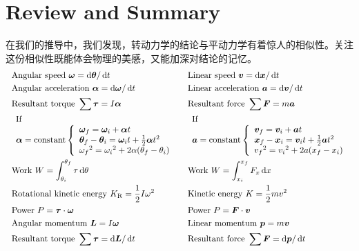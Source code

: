 \section[回顾与总结]{Review and Summary}
在我们的推导中，我们发现，转动力学的结论与平动力学有着惊人的相似性。关注这份相似性既能体会物理的美感，又能加深对结论的记忆。
\[\ \ \begin{aligned}
	&\mathrm{Angular~speed~}\vec{\omega}=\dif\vec{\theta}/\dif t&& \mathrm{Linear~speed~}\vec{v}=\dif \vec{x}/\dif t  \\
	&\mathrm{Angular~acceleration~}\vec{\alpha}=\dif\vec{\omega}/\dif t&& \mathrm{Linear~acceleration~}\vec{a}=\dif \vec{v}/\dif t  \\
	&\mathrm{Resultant~torque~}\sum\vec{\tau}=I\vec{\alpha} && \mathrm{Resultant~force~}\sum \vec{F}=m\vec{a}  \\
	&\begin{array}{l}{{\mathrm{If}}}\\{\vec{\alpha}=\mathrm{constant}}\left\{\begin{array}{l}{{\vec{\omega}_{f}=\vec{\omega}_{i}+\vec{\alpha} t}}\\{{\vec{\theta}_{f}-\vec{\theta}_{i}=\vec{\omega}_{i}t+\frac{1}{2}\vec{\alpha} t^{2}}}\\{{\omega_{f}{}^{2}=\omega_{i}{}^{2}+2\alpha(\theta_{f}-\theta_{i})}}\end{array}\right.\end{array}
	&&
	\begin{array}{l}{{\mathrm{If}}}\\{\vec{a}=\mathrm{constant}}\left\{\begin{array}{l}{{\vec{v}_{f}=\vec{v}_{i}+\vec{a}t}}\\{{\vec{x}_{f}-\vec{x}_{i}=\vec{v}_{i}t+\frac{1}{2}\vec{a}t^{2}}}\\{{v_{f}{}^{2}=v_{i}{}^{2}+2a(x_{f}-x_{i})}}\end{array}\right.\end{array}  \\
	&\mathrm{Work}\ W=\int_{\theta_{i}}^{\theta_{f}}\tau \dif\theta && \mathrm{Work}\ W=\int_{x_{i}}^{x_{f}}F_{x}\dif x  \\
	&\mathrm{Rotational~kinetic~energy~}K_{\mathrm{R}}=\frac{1}{2}I\omega^{2}&& \mathrm{Kinetic~energy~}K=\frac{1}{2}mv^{2}  \\
	&\mathrm{Power}\ P=\vec{\tau}\cdot\vec{\omega}&& \mathrm{Power}\ P=\vec{F}\cdot\vec{v}  \\
	&\mathrm{Angular~momentum~}\vec{L}=I\vec{\omega} && \mathrm{Linear~momentum~}\vec{p}=m\vec{v}  \\
	&\mathrm{Resultant~torque~}\sum\vec{\tau}=\dif \vec{L}/\dif t&& \mathrm{Resultant~force~}\sum \vec{F}=\dif \vec{p}/\dif t 
\end{aligned}\]




  







